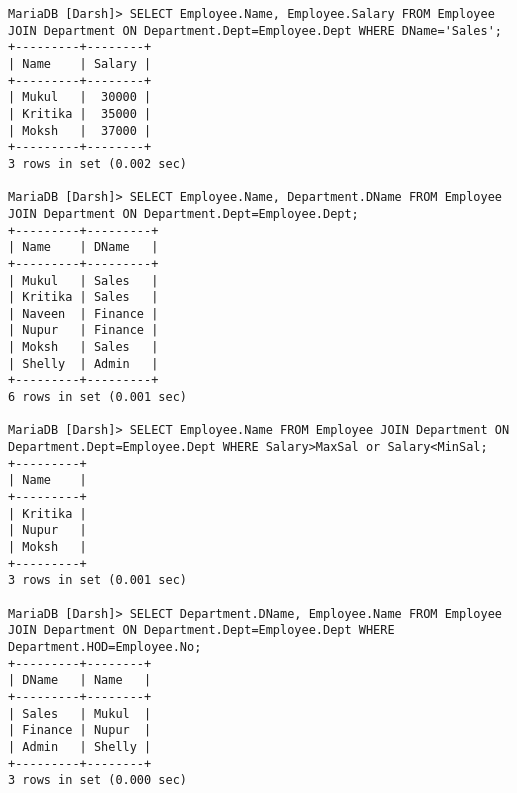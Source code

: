 \documentclass[
a4paper]{article}
\begin{document}
\begin{lstlisting}
MariaDB [Darsh]> SELECT Employee.Name, Employee.Salary FROM Employee JOIN Department ON Department.Dept=Employee.Dept WHERE DName='Sales';
+---------+--------+
| Name    | Salary |
+---------+--------+
| Mukul   |  30000 |
| Kritika |  35000 |
| Moksh   |  37000 |
+---------+--------+
3 rows in set (0.002 sec)

MariaDB [Darsh]> SELECT Employee.Name, Department.DName FROM Employee JOIN Department ON Department.Dept=Employee.Dept;
+---------+---------+
| Name    | DName   |
+---------+---------+
| Mukul   | Sales   |
| Kritika | Sales   |
| Naveen  | Finance |
| Nupur   | Finance |
| Moksh   | Sales   |
| Shelly  | Admin   |
+---------+---------+
6 rows in set (0.001 sec)

MariaDB [Darsh]> SELECT Employee.Name FROM Employee JOIN Department ON Department.Dept=Employee.Dept WHERE Salary>MaxSal or Salary<MinSal;
+---------+
| Name    |
+---------+
| Kritika |
| Nupur   |
| Moksh   |
+---------+
3 rows in set (0.001 sec)

MariaDB [Darsh]> SELECT Department.DName, Employee.Name FROM Employee JOIN Department ON Department.Dept=Employee.Dept WHERE Department.HOD=Employee.No;
+---------+--------+
| DName   | Name   |
+---------+--------+
| Sales   | Mukul  |
| Finance | Nupur  |
| Admin   | Shelly |
+---------+--------+
3 rows in set (0.000 sec)
    
    \end{lstlisting}


 \newpage
 
\end{document}
